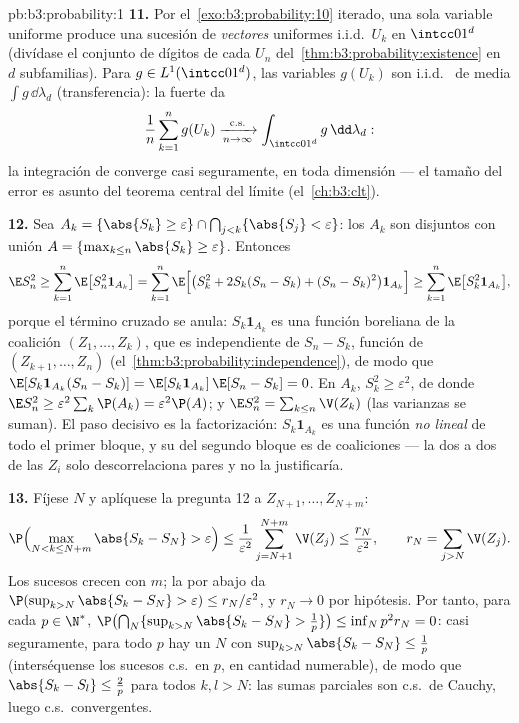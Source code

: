 \begin{solution}{pb:b3:probability:1}
\textbf{11.} Por el~\cref{exo:b3:probability:10} iterado, una sola
variable uniforme produce una sucesión de \emph{vectores} uniformes
i.i.d.\ $U_k$ en $\intcc01^d$ (divídase el conjunto de dígitos de cada
$U_n$ del~\cref{thm:b3:probability:existence} en $d$ subfamilias). Para
$g \in L^1(\intcc01^d)$, las variables $g(U_k)$ son i.i.d.\
 de media $\int g\,\dd\lambda_d$
(transferencia): la \omterm{def:b3:probability:space}{ley} fuerte da
\[
\frac1n\sum_{k=1}^ng(U_k)
\xrightarrow[n\to\infty]{\text{c.s.}}
\int_{\intcc01^d}g\,\dd\lambda_d :
\]
la integración de 
converge casi seguramente, en toda dimensión --- el tamaño del error es
asunto del teorema central del límite (el~\cref{ch:b3:clt}).

\textbf{12.} Sea $A_k = \{\abs{S_k} \geq \varepsilon\} \cap
\bigcap_{j<k}\{\abs{S_j} < \varepsilon\}$: los $A_k$ son disjuntos con
unión $A = \{\max_{k\leq n}\abs{S_k} \geq
\varepsilon\}$. Entonces
\[
\E S_n^2 \geq \sum_{k=1}^n\E\bigl[S_n^2\mathbf 1_{A_k}\bigr]
= \sum_{k=1}^n\E\Bigl[\bigl(S_k^2 + 2S_k(S_n - S_k) + (S_n
- S_k)^2\bigr)\mathbf 1_{A_k}\Bigr]
\geq \sum_{k=1}^n\E\bigl[S_k^2\mathbf 1_{A_k}\bigr],
\]
porque el término cruzado se anula: $S_k\mathbf 1_{A_k}$ es una función
boreliana de la coalición $(Z_1, \dots, Z_k)$, que es
independiente de $S_n - S_k$,
función de $(Z_{k+1},
\dots, Z_n)$ (el~\cref{thm:b3:probability:independence}), de modo que
$\E[S_k\mathbf 1_{A_k}(S_n - S_k)] = \E[S_k\mathbf
1_{A_k}]\,\E[S_n - S_k] = 0$. En $A_k$, $S_k^2 \geq
\varepsilon^2$, de donde $\E S_n^2 \geq
\varepsilon^2\sum_k\P(A_k) = \varepsilon^2\P(A)$; y $\E
S_n^2 = \sum_{k\leq n}\V(Z_k)$ (las varianzas se suman). El paso
decisivo es la factorización: $S_k\mathbf 1_{A_k}$ es una función
\emph{no lineal} de todo el primer bloque, y su
 del segundo
bloque es \omterm{def:b3:probability:independence}{independencia} de
coaliciones --- la
 dos a dos de las
$Z_i$ solo descorrelaciona pares y no la justificaría.

\textbf{13.} Fíjese $N$ y aplíquese la pregunta 12 a $Z_{N+1},
\dots, Z_{N+m}$:
\[
\P\Bigl(\max_{N < k \leq N+m}\abs{S_k - S_N} >
\varepsilon\Bigr) \leq
\frac1{\varepsilon^2}\sum_{j=N+1}^{N+m}\V(Z_j) \leq
\frac{r_N}{\varepsilon^2},
\qquad r_N = \sum_{j>N}\V(Z_j) .
\]
Los sucesos crecen con $m$; la
 por abajo da
$\P(\sup_{k>N}\abs{S_k - S_N} > \varepsilon) \leq
r_N/\varepsilon^2$, y $r_N \to 0$ por hipótesis. Por tanto, para cada
$p \in \N^*$, $\P\bigl(\bigcap_N\{\sup_{k>N}
\abs{S_k - S_N} > \frac1p\}\bigr) \leq \inf_Np^2r_N = 0$: casi
seguramente, para todo $p$ hay un $N$ con
$\sup_{k>N}\abs{S_k - S_N} \leq \frac1p$ (interséquense los sucesos
c.s.\ en $p$, en cantidad numerable), de modo que $\abs{S_k -
S_l} \leq \frac2p$ para todos $k, l > N$: las sumas parciales son c.s.\
de Cauchy, luego c.s.\ convergentes.


\end{solution}
